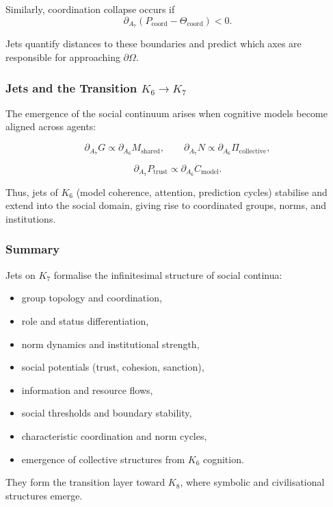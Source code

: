 Similarly, coordination collapse occurs if
\[
\partial_{A_7}(P_{\mathrm{coord}} - \Theta_{\mathrm{coord}})<0.
\]

Jets quantify distances to these boundaries and predict which axes are
responsible for approaching $\partial\Omega$.


\subsubsection{Jets and the Transition \texorpdfstring{$K_6 \to K_7$}{K_6 \to K_7}}

The emergence of the social continuum arises when cognitive models
become aligned across agents:

\[
\partial_{A_7}G
\propto
\partial_{A_6}M_{\mathrm{shared}},
\qquad
\partial_{A_7}N
\propto
\partial_{A_6}\Pi_{\mathrm{collective}},
\]

\[
\partial_{A_7}P_{\mathrm{trust}}
\propto
\partial_{A_6}C_{\mathrm{model}}.
\]

Thus, jets of $K_6$ (model coherence, attention, prediction cycles)
stabilise and extend into the social domain, giving rise to coordinated
groups, norms, and institutions.


\subsubsection{Summary}

Jets on $K_7$ formalise the infinitesimal structure of social continua:

\begin{itemize}
    \item group topology and coordination,
    \item role and status differentiation,
    \item norm dynamics and institutional strength,
    \item social potentials (trust, cohesion, sanction),
    \item information and resource flows,
    \item social thresholds and boundary stability,
    \item characteristic coordination and norm cycles,
    \item emergence of collective structures from $K_6$ cognition.
\end{itemize}

They form the transition layer toward $K_8$, where symbolic and
civilisational structures emerge.
